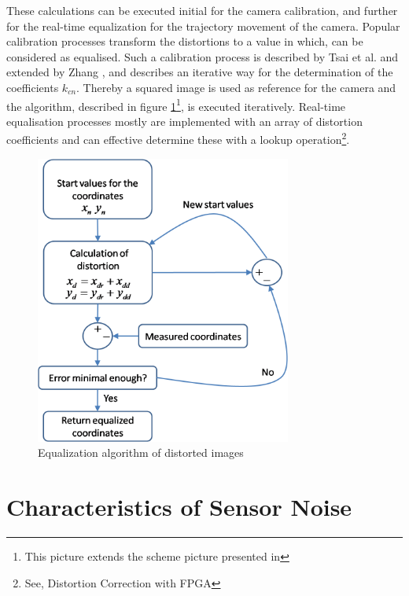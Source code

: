 These calculations can be executed initial for the camera calibration, and
further for the real-time equalization for the trajectory movement of the camera.
Popular calibration processes transform the distortions to a value in which, 
can be considered as equalised. Such a calibration process is described by Tsai
 et al.  and extended by Zhang
 , and describes an iterative way
 for the determination of the coefficients \ensuremath{k_{cn}}. Thereby a
 squared image is used as reference for the camera and the algorithm, described in figure
 \ref{fig:EqualizationAlgorithm.png}\footnote{This picture extends the scheme
 picture presented in }, is
 executed iteratively. Real-time equalisation processes mostly are implemented
 with an array of distortion coefficients and can effective determine these with
 a lookup  operation\footnote{See, Distortion Correction with FPGA }.


\begin{figure}[H]
	\centering
		\includegraphics[width=0.75\textwidth, height=0.75\textwidth]{graphic/EqualizationAlgorithm.png}
\caption{Equalization algorithm of distorted images}
	\label{fig:EqualizationAlgorithm.png}
\end{figure}


\chapter{Characteristics of Sensor Noise}
\label{mt:c:Appendix:s:Characteristics of Sensor Noise}

